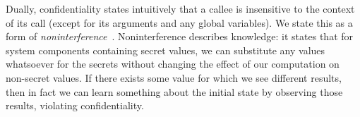 \documentclass[acmsmall,review,anonymous]{acmart}\settopmatter{printfolios=true,printccs=false,printacmref=false}
\begin{document}
Dually, confidentiality states intuitively that a callee is insensitive to
the context of its call (except for its arguments and any global
variables).
We state this as a form of {\em noninterference}~\citep{Goguen1982SecurityPA}.
Noninterference describes knowledge: it states that for system components
containing secret values, we can substitute any values whatsoever for the secrets without changing the effect
of our computation on non-secret values.
If there exists some value for which we see different results, then
in fact we can learn something about the initial state by observing those results, violating
confidentiality.
\end{document}
